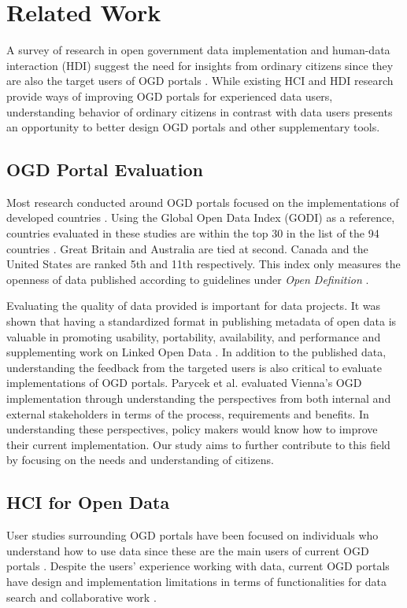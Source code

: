 \documentclass{sigchi}
\begin{document}
\section{Related Work}
A survey of research in open government data implementation and human-data interaction (HDI) suggest the need for insights from ordinary citizens since they are also the target users of OGD portals \cite{warwick2017}. While existing HCI and HDI research provide ways of improving OGD portals for experienced data users, understanding behavior of ordinary citizens in contrast with data users presents an opportunity to better design OGD portals and other supplementary tools. 

\subsection{OGD Portal Evaluation}
Most research conducted around OGD portals focused on the implementations of developed countries \cite{kacprzak2019characterising, klimek2019dcat, koesten2019collaborative,Parycek2014}. Using the Global Open Data Index (GODI) as a reference, countries evaluated in these studies are within the top 30 in the list of the 94 countries \cite{godimetric2016}. Great Britain and Australia are tied at second. Canada and the United States are ranked 5th and 11th respectively. This index only measures the openness of data published according to guidelines under \textit{Open Definition} \cite{godimetric2016}. 

Evaluating the quality of data provided is important for data projects. It was shown that having a standardized format in publishing metadata of open data is valuable in promoting usability, portability, availability, and performance and supplementing work on Linked Open Data \cite{klimek2019dcat}. In addition to the published data, understanding the feedback from the targeted users is also critical to evaluate implementations of OGD portals. Parycek et al. \cite{Parycek2014} evaluated Vienna's OGD implementation through understanding the perspectives from both internal and external stakeholders in terms of the process, requirements and benefits. In understanding these perspectives, policy makers would know how to improve their current implementation. Our study aims to further contribute to this field by focusing on the needs and understanding of citizens.

\subsection{HCI for Open Data}
User studies surrounding OGD portals have been focused on individuals who understand how to use data since these are the main users of current OGD portals \cite{choi2017characteristics, Erete2016, kacprzak2019characterising, koesten2019collaborative, koesten2017trials}. Despite the users' experience working with data, current OGD portals have design and implementation limitations in terms of functionalities for data search \cite{kacprzak2019characterising, koesten2017trials} and collaborative work \cite{choi2017characteristics, Erete2016, koesten2019collaborative}.
\end{document}
